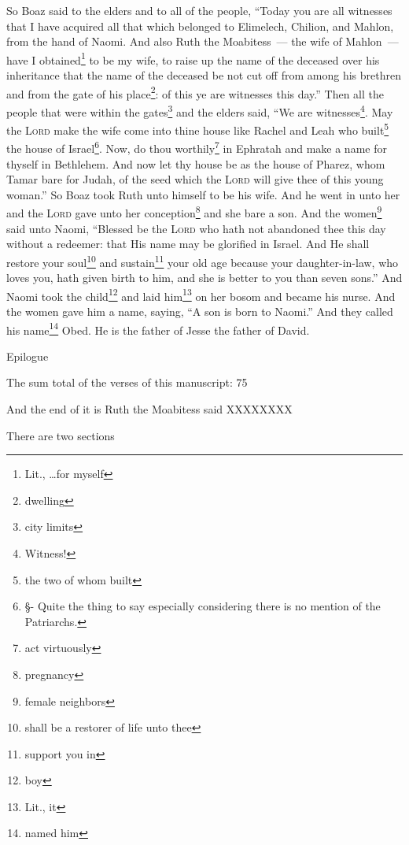 \begin{enumerate}
     So Boaz said to the elders and to all of the people, ``Today you are all witnesses that I have acquired all that which belonged to Elimelech, Chilion, and Mahlon, from the hand of Naomi.%
     And also Ruth the Moabitess~--- the wife of Mahlon~--- have I obtained\footnote{Lit., \dots for myself} to be my wife, to raise up the name of the deceased over his inheritance that the name of the deceased be not cut off from among his brethren and from the gate of his place\footnote{dwelling}: of this ye are witnesses this day.''%
     Then all the people that were within the gates\footnote{city limits} and the elders said, ``We are witnesses\footnote{Witness!}. May the \textsc{Lord} make the wife come into thine house like Rachel and Leah who built\footnote{the two of whom built} the house of Israel\footnote{\S - Quite the thing to say especially considering there is no mention of the Patriarchs.}. Now, do thou worthily\footnote{act virtuously} in Ephratah and make a name for thyself in Bethlehem.%
     And now let thy house be as the house of Pharez, whom Tamar bare for Judah, of the seed which the \textsc{Lord} will give thee of this young woman.''%
     So Boaz took Ruth unto himself to be his wife. And he went in unto her and the \textsc{Lord} gave unto her conception\footnote{pregnancy} and she bare a son.%
     And the women\footnote{female neighbors} said unto Naomi, ``Blessed be the \textsc{Lord} who hath not abandoned thee this day without a redeemer: that His name may be glorified in Israel.%
     And He shall restore your soul\footnote{shall be a restorer of life unto thee} and sustain\footnote{support you in} your old age because your daughter-in-law, who loves you, hath given birth to him, and she is better to you than seven sons.''%
     And Naomi took the child\footnote{boy} and laid him\footnote{Lit., it} on her bosom and became his nurse.%
     And the women gave him a name, saying, ``A son is born to Naomi.'' And they called his name\footnote{named him} Obed. He is the father of Jesse the father of David.%
\end{enumerate}

Epilogue

The sum total of the verses of this manuscript: 75

And the end of it is Ruth the Moabitess said XXXXXXXX

There are two sections
